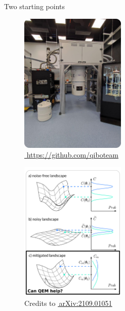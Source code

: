 \documentclass[8pt, xcolor={svgnames}, hyperref={linkcolor=black}]{beamer}
\begin{document}
\begin{frame}{Two starting points}
\begin{multicols}{2}
\begin{figure}
\includegraphics[width=0.45\textwidth, height=0.8\textheight]{figures/tii_lab.png}
\caption*{\href{https://github.com/qiboteam}{\faGithub\,\,https://github.com/qiboteam}}
\end{figure}
\begin{figure}
\includegraphics[width=0.45\textwidth, height=0.8\textheight]{figures/NIBP_3.png}
\caption*{Credits to \href{https://arxiv.org/abs/2109.01051}{\faBook\,arXiv:2109.01051}}
\end{figure}
\end{multicols}
\end{frame}
\end{document}
